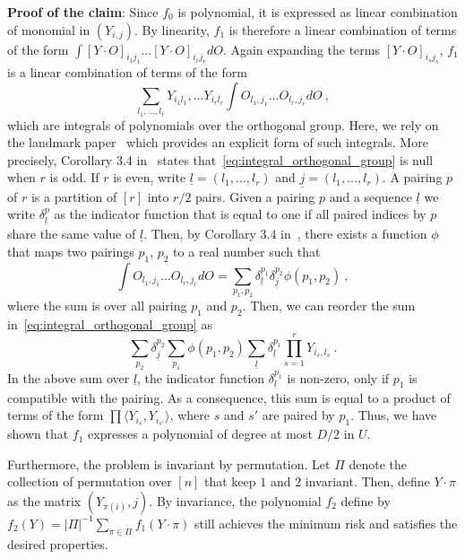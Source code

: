 \documentclass{article}
\begin{document}
\noindent 
{\bf Proof of the claim}: Since $f_0$ is polynomial, it is expressed as linear combination of monomial in $(Y_{i,j})$. By linearity, $f_1$ is therefore a linear combination of terms  of the form  $\int [Y\cdot O]_{i_1j_1}\ldots [Y\cdot O]_{i_rj_r}dO$. Again expanding the terms $[Y\cdot O]_{i_sj_s}$, $f_1$ is a linear combination of terms of the form 
\begin{equation}\label{eq:integral_orthogonal_group}
\sum_{l_1,\ldots, l_r} Y_{i_1l_1},\ldots Y_{i_rl_r}\int O_{l_1,j_1}\ldots O_{l_r,j_r} dO  \ , 
\end{equation}
which are  integrals of polynomials over the orthogonal group.  Here, we rely on the landmark paper~\cite{collins2006integration} which provides an explicit form of such integrals. More precisely, Corollary 3.4 in~\cite{collins2006integration} states that~\eqref{eq:integral_orthogonal_group} is null when $r$ is odd. If $r$ is even, write $\underline{l}= (l_1,\ldots, l_r)$ and $\underline{j}= (l_1,\ldots, l_r)$. A pairing $p$ of $r$ is a partition of $[r]$ into $r/2$ pairs. Given a pairing $p$ and a sequence $\underline{l}$ we write $\delta_{\underline{l}}^{p}$ as the indicator function that is equal to one if all paired indices by $p$  share the same value of $\underline{l}$. Then, by Corollary 3.4 in~\cite{collins2006integration}, there exists a function $\phi$ that maps two pairings $p_1$, $p_2$ to a real number such that 
\[
    \int O_{l_1,j_1}\ldots O_{l_r,j_r} dO = \sum_{p_1, p_2}\delta_{\underline{l}}^{p_1}\delta_{\underline{j}}^{p_2} \phi(p_1,p_2)\ , 
\]
where the sum is over all pairing $p_1$ and $p_2$. Then, we can reorder the sum in~\eqref{eq:integral_orthogonal_group} as 
\[
\sum_{p_2}\delta_{\underline{j}}^{p_2}\sum_{p_1}\phi(p_1,p_2) \sum_{\underline{l}}  \delta_{\underline{l}}^{p_1} \prod_{s=1}^r Y_{i_s,l_s}\ . 
\]
In the above sum over $\underline{l}$, the indicator function $\delta_{\underline{l}}^{p_1}$ is non-zero, only if $p_1$ is compatible with the pairing. As a consequence, this sum is equal to a  product of terms of the form $\prod \langle Y_{i_s}, Y_{i_{s'}}\rangle$, where $s$ and $s'$ are paired by $p_1$. Thus, we have shown that $f_1$ expresses a polynomial of degree at most $D/2$ in $U$. 

Furthermore, the problem is invariant by permutation. Let $\Pi$ denote the collection of permutation over $[n]$ that keep $1$ and $2$ invariant. Then, define $Y\cdot \pi$ as the matrix $(Y_{\pi(i)},j)$. By invariance, the polynomial $f_2$ define by $f_2(Y)= |\Pi|^{-1} \sum_{\pi\in \Pi}f_1(Y\cdot \pi)$ still achieves the minimum risk and satisfies the desired properties. 
\end{document}

